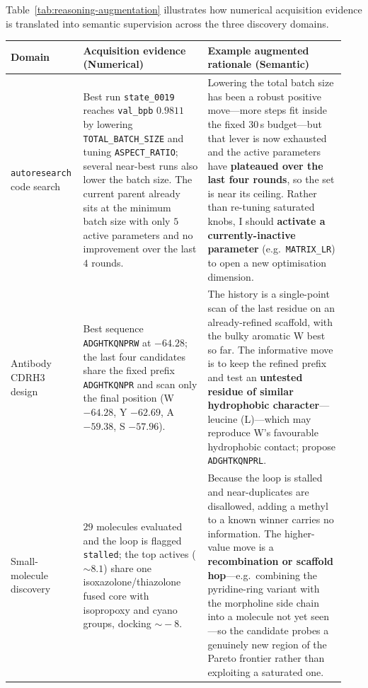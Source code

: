 Table~\ref{tab:reasoning-augmentation} illustrates how numerical acquisition
evidence is translated into semantic supervision across the three discovery
domains.

\begin{table}[H]
\centering
\small
\begin{tabular}{@{}p{0.18\linewidth}p{0.36\linewidth}p{0.40\linewidth}@{}}
\toprule
\textbf{Domain} & \textbf{Acquisition evidence (Numerical)} & \textbf{Example augmented rationale (Semantic)} \\
\midrule
\texttt{autoresearch} code search &
Best run \texttt{state\_0019} reaches \texttt{val\_bpb} $0.9811$ by lowering \texttt{TOTAL\_BATCH\_SIZE} and tuning \texttt{ASPECT\_RATIO}; several near-best runs also lower the batch size. The current parent already sits at the minimum batch size with only $5$ active parameters and no improvement over the last $4$ rounds. &
Lowering the total batch size has been a robust positive move---more steps fit inside the fixed $30$\,s budget---but that lever is now exhausted and the active parameters have \textbf{plateaued over the last four rounds}, so the set is near its ceiling. Rather than re-tuning saturated knobs, I should \textbf{activate a currently-inactive parameter} (e.g.\ \texttt{MATRIX\_LR}) to open a new optimisation dimension. \\
\addlinespace
Antibody CDRH3 design &
Best sequence \texttt{ADGHTKQNPRW} at $-64.28$; the last four candidates share the fixed prefix \texttt{ADGHTKQNPR} and scan only the final position (W $-64.28$, Y $-62.69$, A $-59.38$, S $-57.96$). &
The history is a single-point scan of the last residue on an already-refined scaffold, with the bulky aromatic W best so far. The informative move is to keep the refined prefix and test an \textbf{untested residue of similar hydrophobic character}---leucine (L)---which may reproduce W's favourable hydrophobic contact; propose \texttt{ADGHTKQNPRL}. \\
\addlinespace
Small-molecule discovery &
$29$ molecules evaluated and the loop is flagged \texttt{stalled}; the top actives ($\sim\!8.1$) share one isoxazolone/thiazolone fused core with isopropoxy and cyano groups, docking $\sim\!-8$. &
Because the loop is stalled and near-duplicates are disallowed, adding a methyl to a known winner carries no information. The higher-value move is a \textbf{recombination or scaffold hop}---e.g.\ combining the pyridine-ring variant with the morpholine side chain into a molecule not yet seen---so the candidate probes a genuinely new region of the Pareto frontier rather than exploiting a saturated one. \\

\end{tabular}
\end{table}
